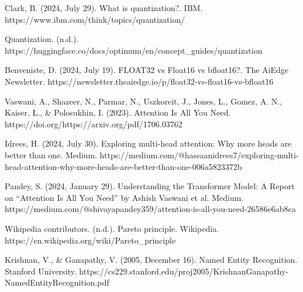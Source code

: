 \documentclass[licencjacka,en]{pracamgr}
\begin{document}
\begin{thebibliography}{99}
Clark, B. (2024, July 29). What is quantization?. IBM. https://www.ibm.com/think/topics/quantization/

Quantization. (n.d.). https://huggingface.co/docs/optimum/en/concept\_guides/quantization

Benveniste, D. (2024, July 19). FLOAT32 vs Float16 vs bfloat16?. The AiEdge Newsletter. https://newsletter.theaiedge.io/p/float32-vs-float16-vs-bfloat16

Vaswani, A., Shazeer, N., Parmar, N., Uszkoreit, J., Jones, L., Gomez, A. N., Kaiser, Ł., \& Polosukhin, I. (2023). Attention Is All You Need. https://doi.org/https://arxiv.org/pdf/1706.03762

Idrees, H. (2024, July 30). Exploring multi-head attention: Why more heads are better than one. Medium. https://medium.com/@hassaanidrees7/exploring-multi-head-attention-why-more-heads-are-better-than-one-006a5823372b

Pandey, S. (2024, January 29). Understanding the Transformer Model: A Report on “Attention Is All You Need” by Ashish Vaswani et al. Medium. https://medium.com/@shivayapandey359/attention-is-all-you-need-26586e6ab8ca

Wikipedia contributors. (n.d.). Pareto principle. Wikipedia. https://en.wikipedia.org/wiki/Pareto\_principle

Krishnan, V., \& Ganapathy, V. (2005, December 16). Named Entity Recognition. Stanford University. https://cs229.stanford.edu/proj2005/KrishnanGanapathy-NamedEntityRecognition.pdf


\end{thebibliography}
\end{document}

